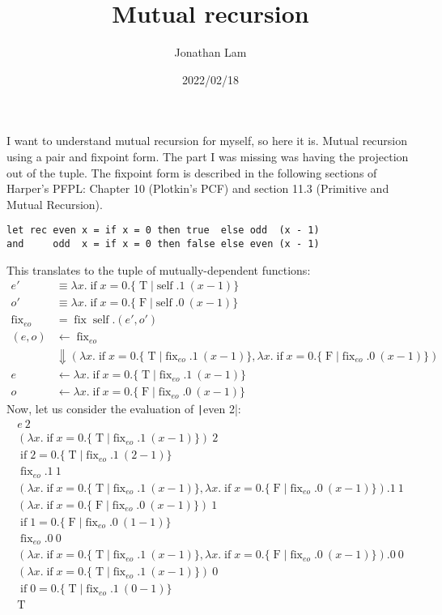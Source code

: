 \documentclass{article}
\title{Mutual recursion}
\author{Jonathan Lam}
\date{2022/02/18}
\DeclareMathOperator{\fix}{fix}
\DeclareMathOperator{\self}{self}
\DeclareMathOperator{\ife}{if}
\DeclareMathOperator{\true}{T}
\DeclareMathOperator{\false}{F}
\begin{document}
\maketitle{}

\noindent{}
I want to understand mutual recursion for myself, so here it is. Mutual recursion using a pair and fixpoint form. The part I was missing was having the projection out of the tuple. The fixpoint form is described in the following sections of Harper's PFPL: Chapter 10 (Plotkin's PCF) and section 11.3 (Primitive and Mutual Recursion).

\begin{verbatim}
let rec even x = if x = 0 then true  else odd  (x - 1)
and     odd  x = if x = 0 then false else even (x - 1)
\end{verbatim}
This translates to the tuple of mutually-dependent functions:
\begin{align}
  e' &\equiv\lambda x.\ife x=0.\{\true|\self.1\ (x-1)\} \\
  o' &\equiv\lambda x.\ife x=0.\{\false|\self.0\ (x-1)\} \\
  \fix_{eo} &=\fix\self.(e',o') \\
  (e,o) &\leftarrow\fix_{eo} \\
     &\Downarrow(\lambda x.\ife x=0.\{\true|\fix_{eo}.1\ (x-1)\},
       \lambda x.\ife x=0.\{\false|\fix_{eo}.0\ (x-1)\}) \\
  e &\leftarrow\lambda x.\ife x=0.\{\true|\fix_{eo}.1\ (x-1)\} \\
  o &\leftarrow\lambda x.\ife x=0.\{\false|\fix_{eo}.0\ (x-1)\}
\end{align}
Now, let us consider the evaluation of \texttt|even 2|:
\begin{gather}
  e\ 2 \\
  (\lambda x.\ife x=0.\{\true|\fix_{eo}.1\ (x-1)\})\ 2 \\
  \ife 2=0.\{\true|\fix_{eo}.1\ (2-1)\} \\
  \fix_{eo}.1\ 1 \\
  (\lambda x.\ife x=0.\{\true|\fix_{eo}.1\ (x-1)\},
  \lambda x.\ife x=0.\{\false|\fix_{eo}.0\ (x-1)\}).1\ 1 \\
  (\lambda x.\ife x=0.\{\false|\fix_{eo}.0\ (x-1)\})\ 1 \\
  \ife 1=0.\{\false|\fix_{eo}.0\ (1-1)\} \\
  \fix_{eo}.0\ 0 \\
  (\lambda x.\ife x=0.\{\true|\fix_{eo}.1\ (x-1)\},
  \lambda x.\ife x=0.\{\false|\fix_{eo}.0\ (x-1)\}).0\ 0 \\
  (\lambda x.\ife x=0.\{\true|\fix_{eo}.1\ (x-1)\})\ 0 \\
  \ife 0=0.\{\true|\fix_{eo}.1\ (0-1)\} \\
  \true
\end{gather}
\end{document}
